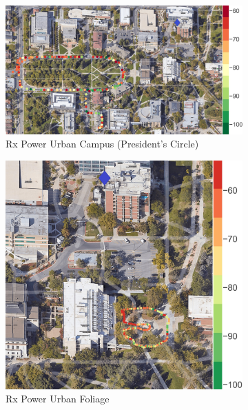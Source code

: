 \documentclass[10pt, twocolumn]{IEEEtran}
\begin{document}
\begin{figure} [t]
     \centering
     \begin{subfigure}{0.460\linewidth}
         \centering
         \includegraphics[width=1.0\linewidth]{figs/rx_urban_campus.jpg}
         \caption{Rx Power Urban Campus (President's Circle)}
         \label{F4a}
     \end{subfigure}
     \begin{subfigure}{0.2579\linewidth}
         \centering
         \includegraphics[width=1.0\linewidth]{figs/rx_urban_vegetation.jpg}
         \caption{Rx Power Urban Foliage}
         \label{F4b}
     \end{subfigure}
     \begin{subfigure}{0.2579\linewidth}

\end{subfigure}
\end{figure}
\end{document}
